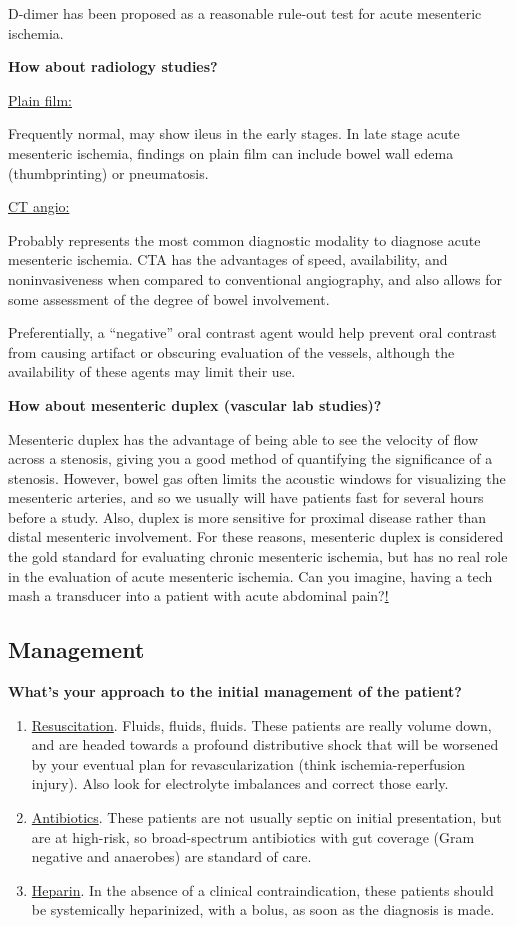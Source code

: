 \documentclass[
]{book}
\begin{document}
D-dimer has been proposed as a reasonable rule-out test for acute
mesenteric ischemia.

\textbf{How about radiology studies?}

\uline{Plain film:}

Frequently normal, may show ileus in the early stages. In late stage
acute mesenteric ischemia, findings on plain film can include bowel wall
edema (thumbprinting) or pneumatosis.

\uline{CT angio:}

Probably represents the most common diagnostic modality to diagnose
acute mesenteric ischemia. CTA has the advantages of speed,
availability, and noninvasiveness when compared to conventional
angiography, and also allows for some assessment of the degree of bowel
involvement.~

Preferentially, a ``negative'' oral contrast agent would help prevent oral
contrast from causing artifact or obscuring evaluation of the vessels,
although the availability of these agents may limit their use.

\textbf{How about mesenteric duplex (vascular lab studies)?}

Mesenteric duplex has the advantage of being able to see the velocity of
flow across a stenosis, giving you a good method of quantifying the
significance of a stenosis. However, bowel gas often limits the acoustic
windows for visualizing the mesenteric arteries, and so we usually will
have patients fast for several hours before a study. Also, duplex is
more sensitive for proximal disease rather than distal mesenteric
involvement. For these reasons, mesenteric duplex is considered the gold
standard for evaluating chronic mesenteric ischemia, but has no real
role in the evaluation of acute mesenteric ischemia. Can you imagine,
having a tech mash a transducer into a patient with acute abdominal
pain?\uline{!}~

\hypertarget{management-23}{%
\subsection{Management}\label{management-23}}

\textbf{What's your approach to the initial management of the patient?}

\begin{enumerate}
\def\labelenumi{\arabic{enumi}.}
\item
  \uline{Resuscitation}. Fluids, fluids, fluids. These patients
  are really volume down, and are headed towards a profound
  distributive shock that will be worsened by your eventual plan for
  revascularization (think ischemia-reperfusion injury). Also look for
  electrolyte imbalances and correct those early.
\item
  \uline{Antibiotics}. These patients are not usually septic on
  initial presentation, but are at high-risk, so broad-spectrum
  antibiotics with gut coverage (Gram negative and anaerobes) are
  standard of care.
\item
  \uline{Heparin}. In the absence of a clinical
  contraindication, these patients should be systemically heparinized,
  with a bolus, as soon as the diagnosis is made.~
\end{enumerate}
\end{document}
